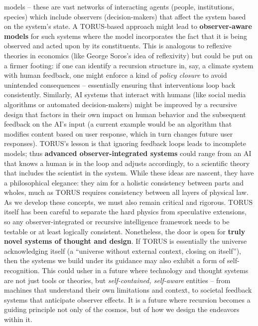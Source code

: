\begin{itemize}
  models -- these are vast networks of interacting agents (people,
  institutions, species) which include observers (decision-makers) that
  affect the system based on the system's state. A TORUS-based approach
  might lead to \textbf{observer-aware models} for such systems where
  the model incorporates the fact that it is being observed and acted
  upon by its constituents. This is analogous to reflexive theories in
  economics (like George Soros's idea of reflexivity) but could be put
  on a firmer footing: if one can identify a recursion structure in,
  say, a climate system with human feedback, one might enforce a kind of
  \emph{policy closure} to avoid unintended consequences -- essentially
  ensuring that interventions loop back consistently. Similarly, AI
  systems that interact with humans (like social media algorithms or
  automated decision-makers) might be improved by a recursive design
  that factors in their own impact on human behavior and the subsequent
  feedback on the AI's input (a current example would be an algorithm
  that modifies content based on user response, which in turn changes
  future user responses). TORUS's lesson is that ignoring feedback loops
  leads to incomplete models; thus \textbf{advanced observer-integrated
  systems} could range from an AI that knows a human is in the loop and
  adjusts accordingly, to a scientific theory that includes the
  scientist in the system. While these ideas are nascent, they have a
  philosophical elegance: they aim for a holistic consistency between
  parts and wholes, much as TORUS requires consistency between all
  layers of physical law​. As we develop these concepts, we must also
  remain critical and rigorous. TORUS itself has been careful to
  separate the hard physics from speculative extensions​, so any
  observer-integrated or recursive intelligence framework needs to be
  testable or at least logically consistent. Nonetheless, the door is
  open for \textbf{truly novel systems of thought and design}. If TORUS
  is essentially the universe acknowledging itself (a ``universe without
  external context, closing on itself''​), then the systems we build
  under its guidance may also exhibit a form of self-recognition. This
  could usher in a future where technology and thought systems are not
  just tools or theories, but \emph{self-contained, self-aware} entities
  -- from machines that understand their own limitations and context, to
  societal feedback systems that anticipate observer effects. It is a
  future where recursion becomes a guiding principle not only of the
  cosmos, but of how we design the endeavors within it.
\end{itemize}

